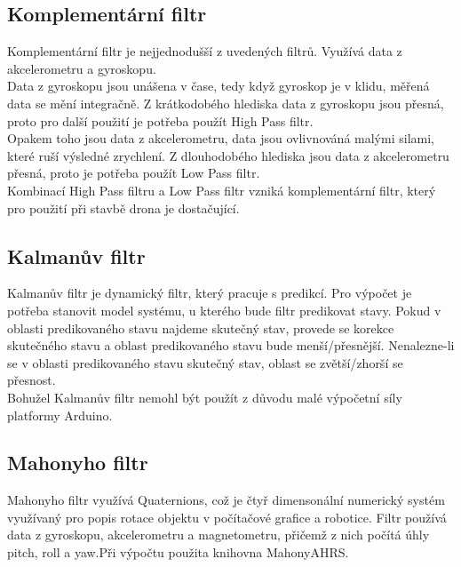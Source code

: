 
\subsection{Komplementární filtr}
Komplementární filtr je nejjednodušší z uvedených filtrů. Využívá data z akcelerometru a gyroskopu. \\
Data z gyroskopu jsou unášena v čase, tedy když gyroskop je v klidu, měřená data se mění integračně. Z krátkodobého hlediska data z gyroskopu jsou přesná, proto pro další použití je potřeba použít High Pass filtr.\\
Opakem toho jsou data z akcelerometru, data jsou ovlivnováná malými silami, které ruší výsledné zrychlení. Z dlouhodobého hlediska jsou data z akcelerometru přesná, proto je potřeba použít Low Pass filtr.\\
Kombinací High Pass filtru a Low Pass filtr vzniká komplementární filtr, který pro použití při stavbě drona je dostačující.\\

\subsection{Kalmanův filtr}
Kalmanův filtr je dynamický filtr, který pracuje s predikcí. Pro výpočet je potřeba stanovit model systému, u kterého bude filtr predikovat stavy. Pokud v oblasti predikovaného stavu najdeme skutečný stav, provede se korekce skutečného stavu a oblast predikovaného stavu bude menší/přesnější. Nenalezne-li se v oblasti predikovaného stavu skutečný stav, oblast se zvětší/zhorší se přesnost.\\
Bohužel Kalmanův filtr nemohl být použít z důvodu malé výpočetní síly platformy Arduino.

\subsection{Mahonyho filtr}
Mahonyho filtr využívá Quaternions, což je čtyř dimensonální numerický systém využívaný pro popis rotace objektu v počítačové grafice a robotice. Filtr používá data z gyroskopu, akcelerometru a magnetometru, přičemž z nich počítá úhly pitch, roll a yaw.Při výpočtu použita knihovna MahonyAHRS.\\

